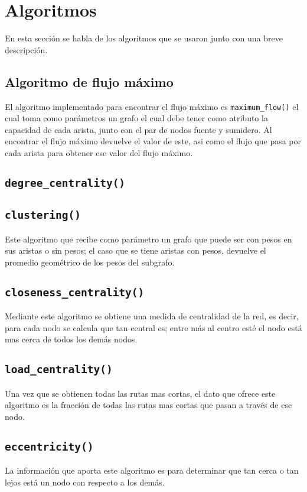 \documentclass{article}
\begin{document}
\section*{Algoritmos}
En esta sección se habla de los algoritmos que se usaron junto con una breve descripción.

\subsection*{Algoritmo de flujo máximo}
El algoritmo implementado para encontrar el flujo máximo es \texttt{maximum\_flow()} el cual toma como parámetros un grafo el cual debe tener como atributo la capacidad de cada arista, junto con el par de nodos fuente y sumidero. Al encontrar el flujo máximo devuelve el valor de este, asi como el flujo que pasa por cada arista para obtener ese valor del flujo máximo.

\subsection*{\texttt{degree\_centrality()}}


\subsection*{\texttt{clustering()}}
Este algoritmo que recibe como parámetro un grafo que puede ser con pesos en sus aristas o sin pesos; el caso que se tiene aristas con pesos, devuelve el promedio geométrico de los pesos del subgrafo.

\subsection*{\texttt{closeness\_centrality()}}
Mediante este algoritmo se obtiene una medida de centralidad de la red, es decir, para cada nodo se calcula que tan central es; entre más al centro esté el nodo está mas cerca de todos los demás nodos. 

\subsection*{\texttt{load\_centrality()}}
Una vez que se obtienen todas las rutas mas cortas, el dato que ofrece este algoritmo es la fracción de todas las rutas mas cortas que pasan a través de ese nodo.

\subsection*{\texttt{eccentricity()}}
La información que aporta este algoritmo es para determinar que tan cerca o tan lejos está un nodo con respecto a los demás.
\end{document}
